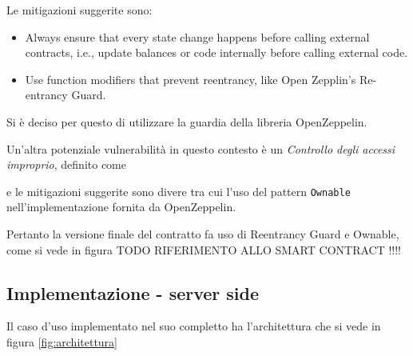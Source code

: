 \documentclass[a4paper,11pt]{article}
\begin{document}
Le mitigazioni suggerite sono:

\begin{itemize}
    \item Always ensure that every state change happens before calling external contracts, i.e., update balances or code internally before calling external code. \cite{owaspReentrancy}
    \item Use function modifiers that prevent reentrancy, like Open Zepplin’s Re-entrancy Guard. \cite{owaspReentrancy}
\end{itemize}

Si è deciso per questo di utilizzare la guardia della libreria OpenZeppelin.

Un'altra potenziale vulnerabilità in questo contesto è un \textit{Controllo degli accessi improprio}, definito come  \cite{owaspOWASPSmart}

e le mitigazioni suggerite sono divere tra cui l'uso del pattern \texttt{Ownable} nell'implementazione fornita da OpenZeppelin.

Pertanto la versione finale del contratto fa uso di Reentrancy  Guard e Ownable, come si vede in figura TODO RIFERIMENTO ALLO SMART CONTRACT !!!!

\subsection{Implementazione - server side}


Il caso d'uso implementato nel suo completto ha l'architettura che si vede in figura \ref{fig:architettura}
\end{document}
